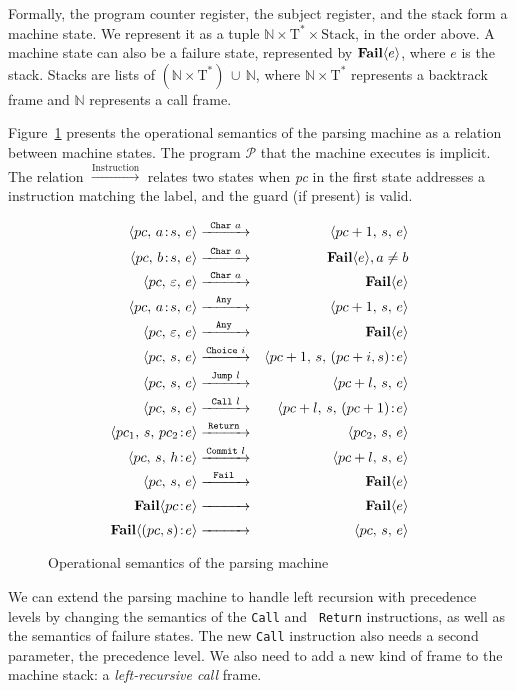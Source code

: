 Formally, the program counter register, the subject register, and
the stack form a machine state. We represent it as a tuple
$\mathbb{N} \times \mathrm{T}^* \times \mathrm{Stack}$, 
in the order above. A machine state can also be a
failure state, represented by $\Sfail{e}$, where $e$ is the
stack. Stacks are lists of $(\mathbb{N} \times \mathrm{T}^*)
\,\cup\, \mathbb{N}$, where
$\mathbb{N} \times \mathrm{T}^*$ represents a 
backtrack frame and $\mathbb{N}$ represents a call frame.

Figure~\ref{fig:semantics} presents the operational semantics of the 
parsing machine as a relation between machine states. The program
$\mathcal{P}$ that the machine executes is implicit. The relation
$\xrightarrow{\mathrm{Instruction}}$ relates two states when \emph{pc}
in the first state addresses a instruction matching the label, and the
guard (if present) is valid.

%
\begin{figure}[t]
{\small
\begin{eqnarray*}
\Sstep{\Sstate{pc}{a\!:\!s}{e}}{\Ia{Char}{a}}%
      {\Sstate{pc+1}{s}{e}}{}
\Sstep{\Sstate{pc}{b\!:\!s}{e}}{\Ia{Char}{a}}%
      {\Sfail{e}}{, a \neq b}
\Sstep{\Sstate{pc}{\Epsi}{e}}{\Ia{Char}{a}}%
      {\Sfail{e}}{}
\Sstep{\Sstate{pc}{a\!:\!s}{e}}{\Ia{Any}{}}%
      {\Sstate{pc+1}{s}{e}}{}
\Sstep{\Sstate{pc}{\Epsi}{e}}{\Ia{Any}{}}%
      {\Sfail{e}}{}
\Sstep{\Sstate{pc}{s}{e}}{\Ia{Choice}{i}}%
      {\Sstate{pc+1}{s}{(pc+i,s)\!:\!e}}{}
\Sstep{\Sstate{pc}{s}{e}}{\Ia{Jump}{l}}%
      {\Sstate{pc+l}{s}{e}}{}
\Sstep{\Sstate{pc}{s}{e}}{\Ia{Call}{l}}%
      {\Sstate{pc+l}{s}{(pc+1)\!:\!e}}{}
\Sstep{\Sstate{pc_1}{s}{pc_2\!:\!e}}{\Ia{Return}{}}%
      {\Sstate{pc_2}{s}{e}}{}
\Sstep{\Sstate{pc}{s}{h\!:\!e}}{\Ia{Commit}{l}}%
      {\Sstate{pc+l}{s}{e}}{}
\Sstep{\Sstate{pc}{s}{e}}{\Ia{Fail}{}}%
      {\Sfail{e}}{}
\Ssteppp{\Sfail{pc\!:\!e}}%
      {\Sfail{e}}{}
\Sstepppf{\Sfail{(pc,s)\!:\!e}}%
      {\Sstate{pc}{s}{e}}{}
\end{eqnarray*}
\caption{Operational semantics of the parsing machine}
\label{fig:semantics}
}
\end{figure}

We can extend the parsing machine to handle left recursion with
precedence levels by changing the semantics of the {\tt Call} and {\tt
  Return} instructions, as well as the semantics of failure
states. The new {\tt Call} instruction also needs a second parameter, the
precedence level. We also need to add a new kind of frame to the
machine stack: a {\em left-recursive call} frame. 

